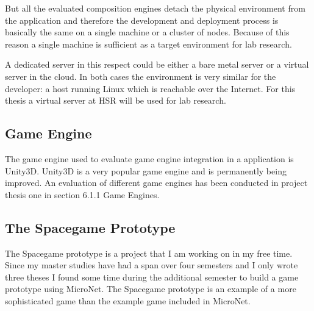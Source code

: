 But all the evaluated composition engines detach the physical environment from
the application and therefore the development and deployment process is basically
the same on a single machine or a cluster of nodes. Because of this reason a
single machine is sufficient as a target environment for lab research.

A dedicated server in this respect could be either a bare metal server or a
virtual server in the cloud. In both cases the environment is very similar for
the developer: a host running Linux which is reachable over the Internet. For
this thesis a virtual server at HSR will be used for lab research.

\subsection{Game Engine}

The game engine used to evaluate game engine integration in a \ms{} application
is Unity3D. Unity3D is a very popular game engine and is permanently being
improved. An evaluation of different game engines has been conducted in project
thesis one \cite{biedermann2015project1} in section 6.1.1 Game Engines.

\subsection{The Spacegame Prototype}

The Spacegame prototype is a project that I am working on in my free time. Since
my master studies have had a span over four semesters and I only wrote three
theses I found some time during the additional semester to build a game prototype using
MicroNet. The Spacegame prototype is an example of a more sophisticated game
than the example game included in MicroNet.

